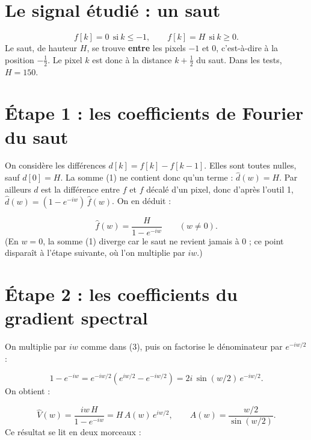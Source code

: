 \documentclass[11pt,a4paper]{article}
\begin{document}
\section*{Le signal étudié : un saut}
\begin{equation}
f[k] = 0 \ \ \mathrm{si}\ k \leq -1, \qquad f[k] = H \ \ \mathrm{si}\ k \geq 0 .
\end{equation}
Le saut, de hauteur $H$, se trouve \textbf{entre} les pixels $-1$ et $0$, c'est-à-dire à la position $-\frac{1}{2}$. Le pixel $k$ est donc à la distance $k + \frac{1}{2}$ du saut. Dans les tests, $H = 150$.

\section*{Étape 1 : les coefficients de Fourier du saut}
On considère les différences $d[k] = f[k] - f[k-1]$. Elles sont toutes nulles, sauf $d[0] = H$. La somme (1) ne contient donc qu'un terme : $\hat{d}(w) = H$. Par ailleurs $d$ est la différence entre $f$ et $f$ décalé d'un pixel, donc d'après l'outil 1, $\hat{d}(w) = (1 - e^{-iw})\, \hat{f}(w)$. On en déduit :

\begin{equation}
\hat{f}(w) = \frac{H}{1 - e^{-iw}} \qquad (w \neq 0) .
\end{equation}
(En $w = 0$, la somme (1) diverge car le saut ne revient jamais à 0 ; ce point disparaît à l'étape suivante, où l'on multiplie par $iw$.)

\section*{Étape 2 : les coefficients du gradient spectral}
On multiplie par $iw$ comme dans (3), puis on factorise le dénominateur par $e^{-iw/2}$ :

\[
1 - e^{-iw} = e^{-iw/2}\left(e^{iw/2} - e^{-iw/2}\right) = 2i\, \sin(w/2)\, e^{-iw/2} .
\]
On obtient :

\begin{equation}
\hat{V}(w) = \frac{iw\, H}{1 - e^{-iw}} = H\, A(w)\, e^{iw/2}, \qquad A(w) = \frac{w/2}{\sin(w/2)} .
\end{equation}
Ce résultat se lit en deux morceaux :
\end{document}
